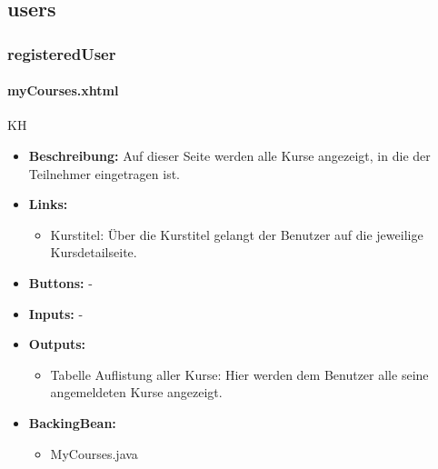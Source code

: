 		\subsection{users}
		
			\subsubsection{registeredUser}
				
				\paragraph{myCourses.xhtml}
					KH\\
					\begin{itemize}
						\item \textbf{Beschreibung:} Auf dieser Seite werden alle Kurse angezeigt, in die der Teilnehmer eingetragen ist.
						\item \textbf{Links:}
							\begin{itemize}
								\item Kurstitel: Über die Kurstitel gelangt der Benutzer auf die jeweilige Kursdetailseite.
							\end{itemize}
						\item \textbf{Buttons:} -
						\item \textbf{Inputs:} -
						\item \textbf{Outputs:}
							\begin{itemize}
								\item Tabelle Auflistung aller Kurse: Hier werden dem Benutzer alle seine angemeldeten Kurse angezeigt.
							\end{itemize}
						\item \textbf{BackingBean:}
							\begin{itemize}
								\item MyCourses.java
							\end{itemize}
					\end{itemize}
				
